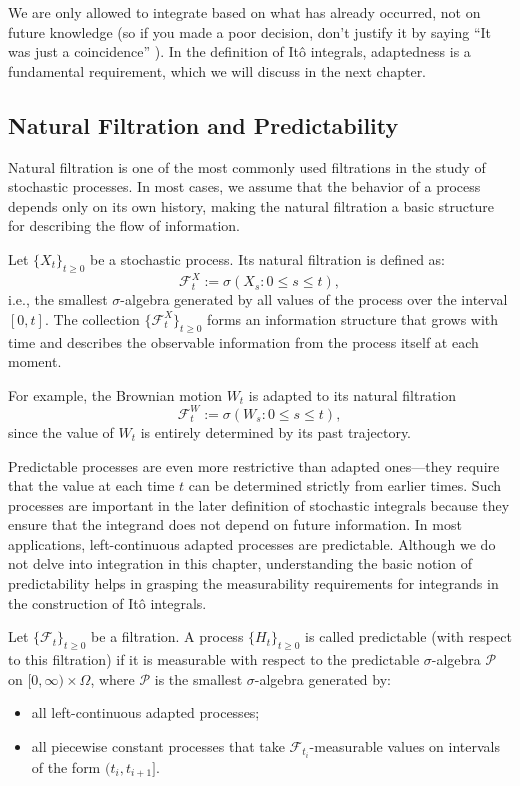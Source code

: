 \documentclass{article}
\begin{document}
We are only allowed to integrate based on what has already occurred, not on future knowledge (so if you made a poor decision, don’t justify it by saying “It was just a coincidence” ). In the definition of Itô integrals, adaptedness is a fundamental requirement, which we will discuss in the next chapter.

\subsection{Natural Filtration and Predictability}

Natural filtration is one of the most commonly used filtrations in the study of stochastic processes. In most cases, we assume that the behavior of a process depends only on its own history, making the natural filtration a basic structure for describing the flow of information.

\begin{definition}
Let $\{X_t\}_{t \geq 0}$ be a stochastic process. Its natural filtration is defined as:
\[
\mathcal{F}^X_t := \sigma(X_s : 0 \leq s \leq t),
\]
i.e., the smallest $\sigma$-algebra generated by all values of the process over the interval $[0, t]$. The collection $\{\mathcal{F}^X_t\}_{t \geq 0}$ forms an information structure that grows with time and describes the observable information from the process itself at each moment.
\end{definition}

For example, the Brownian motion $W_t$ is adapted to its natural filtration
\[
\mathcal{F}^W_t := \sigma(W_s : 0 \leq s \leq t),
\]
since the value of $W_t$ is entirely determined by its past trajectory.

Predictable processes are even more restrictive than adapted ones—they require that the value at each time $t$ can be determined strictly from earlier times. Such processes are important in the later definition of stochastic integrals because they ensure that the integrand does not depend on future information. In most applications, left-continuous adapted processes are predictable. Although we do not delve into integration in this chapter, understanding the basic notion of predictability helps in grasping the measurability requirements for integrands in the construction of Itô integrals.

\begin{definition}
Let $\{\mathcal{F}_t\}_{t \geq 0}$ be a filtration. A process $\{H_t\}_{t \geq 0}$ is called predictable (with respect to this filtration) if it is measurable with respect to the predictable $\sigma$-algebra $\mathcal{P}$ on $[0,\infty) \times \Omega$, where $\mathcal{P}$ is the smallest $\sigma$-algebra generated by:

\begin{itemize}
    \item all left-continuous adapted processes;
    \item all piecewise constant processes that take $\mathcal{F}_{t_i}$-measurable values on intervals of the form $(t_i, t_{i+1}]$.
\end{itemize}
\end{definition}
\end{document}
